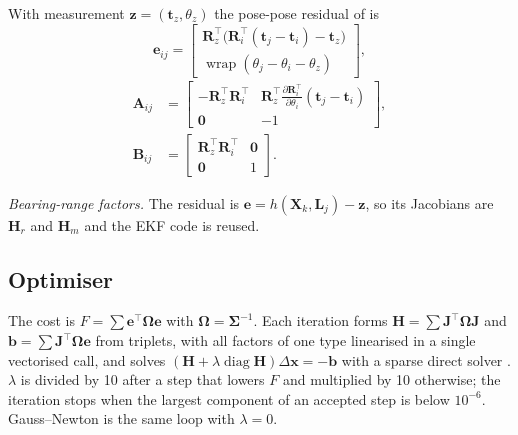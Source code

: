 \documentclass[conference]{IEEEtran}
\newcommand{\vect}[1]{\mathbf{#1}}
\newcommand{\T}{^{\top}}
\newcommand{\wrap}{\operatorname{wrap}}
\begin{document}
With measurement $\vect{z} = (\vect{t}_z, \theta_z)$ the pose-pose residual of \cite{grisetti2010} is
\begin{equation}
\vect{e}_{ij} = \begin{bmatrix} \vect{R}_z\T\bigl(\vect{R}_i\T(\vect{t}_j - \vect{t}_i) - \vect{t}_z\bigr)\\ \wrap(\theta_j - \theta_i - \theta_z)\end{bmatrix},
\label{eq:between}
\end{equation}
\begin{equation}
\begin{aligned}
\vect{A}_{ij} &= \begin{bmatrix} -\vect{R}_z\T\vect{R}_i\T & \vect{R}_z\T\tfrac{\partial\vect{R}_i\T}{\partial\theta_i}(\vect{t}_j - \vect{t}_i)\\ \vect{0} & -1\end{bmatrix},\\
\vect{B}_{ij} &= \begin{bmatrix} \vect{R}_z\T\vect{R}_i\T & \vect{0}\\ \vect{0} & 1\end{bmatrix}.
\end{aligned}
\end{equation}

\emph{Bearing-range factors.} The residual is $\vect{e} = h(\vect{X}_k, \vect{L}_j) - \vect{z}$, so its Jacobians are $\vect{H}_r$ and $\vect{H}_m$ and the EKF code is reused.

\subsection{Optimiser}
The cost is $F = \sum \vect{e}\T\boldsymbol{\Omega}\vect{e}$ with $\boldsymbol{\Omega} = \boldsymbol{\Sigma}^{-1}$. Each iteration forms $\vect{H} = \sum\vect{J}\T\boldsymbol{\Omega}\vect{J}$ and $\vect{b} = \sum\vect{J}\T\boldsymbol{\Omega}\vect{e}$ from triplets, with all factors of one type linearised in a single vectorised call, and solves $(\vect{H} + \lambda\operatorname{diag}\vect{H})\Delta\vect{x} = -\vect{b}$ with a sparse direct solver \cite{dellaert2017}. $\lambda$ is divided by 10 after a step that lowers $F$ and multiplied by 10 otherwise; the iteration stops when the largest component of an accepted step is below $10^{-6}$. Gauss--Newton is the same loop with $\lambda = 0$.
\end{document}
